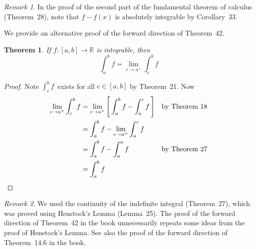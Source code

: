 \documentclass[letterpaper,12pt]{article}
\newcommand{\R}{\mathbb{R}}
\theoremstyle{plain}
\newtheorem*{thm}{Theorem}
\theoremstyle{definition}
\theoremstyle{remark}
\newtheorem*{rmk}{Remark}
\begin{document}
\begin{rmk}
In the proof of the second part of the fundamental theorem of calculus (Theorem~28), note that \(f-f(x)\) is absolutely integrable by Corollary~33.
\end{rmk}

\noindent We provide an alternative proof of the forward direction of Theorem~42.
\begin{thm} If \(f:[a,b]\to\R\) is integrable, then
\[\int_a^b f=\lim_{c\to a^+}\int_c^b f\]
\end{thm}
\begin{proof}
Note \(\int_c^b f\)~exists for all \(c\in[a,b]\) by Theorem~21. Now
\begin{align*}
\lim_{c\to a^+}\int_c^b f&=\lim_{c\to a^+}\left[\,\int_a^b f-\int_a^c f\,\right]&&\text{by Theorem~18}\\
	&=\int_a^b f-\lim_{c\to a^+}\int_a^c f&&\\
	&=\int_a^b f-\int_a^a f&&\text{by Theorem~27}\\
	&=\int_a^b f&&\qedhere
\end{align*}
\end{proof}
\begin{rmk}
We used the continuity of the indefinite integral (Theorem~27), which was proved using Henstock's Lemma (Lemma~25). The proof of the forward direction of Theorem~42 in the book unnecessarily repeats some ideas from the proof of Henstock's Lemma. See also the proof of the forward direction of Theorem~14.6 in the book.
\end{rmk}
\end{document}
